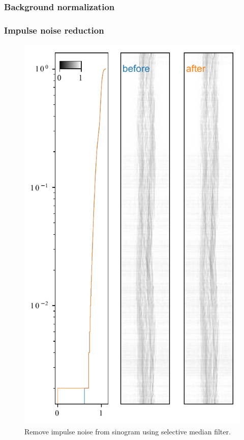 \documentclass[12pt]{scrartcl}
\newcommand{\myscale}{1}
\begin{document}
\subsubsection{Background normalization}\label{sec: bg norm}

\subsubsection{Impulse noise reduction}\label{sec: noise reduction}

\renewcommand{\myscale}{1}
\begin{figure}
\centering
\includegraphics[scale=\myscale]{sinogramDenoise_retouched}
\caption{
Remove impulse noise from sinogram using selective median filter.
}\label{fig: noise reduction}
\end{figure}
\end{document}
